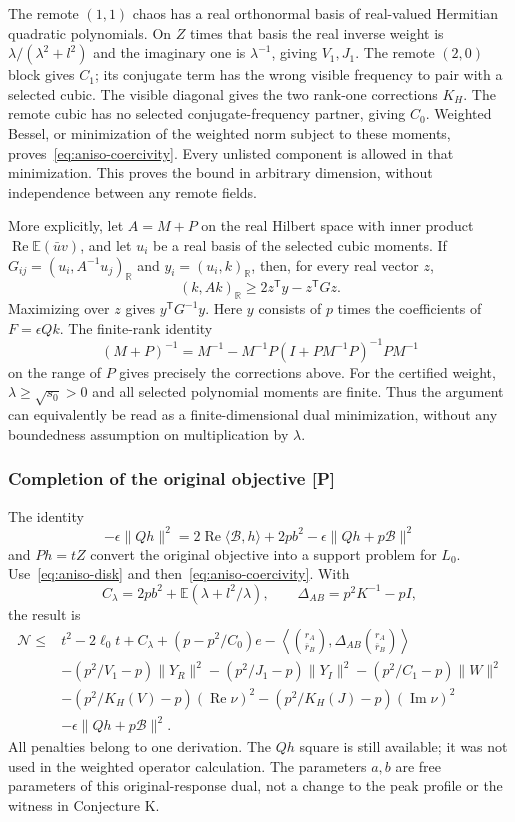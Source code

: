 The remote $(1,1)$ chaos has a real orthonormal basis of real-valued
Hermitian quadratic polynomials. On $Z$ times that basis the real inverse
weight is $\lambda/(\lambda^2+l^2)$ and the imaginary one is
$\lambda^{-1}$, giving $V_1,J_1$. The remote $(2,0)$ block gives $C_1$;
its conjugate term has the wrong visible frequency to pair with a selected
cubic. The visible diagonal gives the two rank-one corrections $K_H$.
The remote cubic has no selected conjugate-frequency partner, giving
$C_0$. Weighted Bessel, or minimization of the weighted norm subject to
these moments, proves~\eqref{eq:aniso-coercivity}. Every unlisted component
is allowed in that minimization. This proves the bound in arbitrary
dimension, without independence between any remote fields.

More explicitly, let $A=M+P$ on the real Hilbert space with inner product
$\operatorname{Re}\mathbb E(\bar u v)$, and let $u_i$ be a real basis of
the selected cubic moments. If
$G_{ij}=(u_i,A^{-1}u_j)_{\mathbb R}$ and
$y_i=(u_i,k)_{\mathbb R}$, then, for every real vector $z$,
\[
 (k,Ak)_{\mathbb R}\ge 2z^{\mathsf T}y-z^{\mathsf T}Gz.
\]
Maximizing over $z$ gives $y^{\mathsf T}G^{-1}y$. Here $y$ consists of
$p$ times the coefficients of $F=\epsilon Qk$. The finite-rank identity
\[
 (M+P)^{-1}=M^{-1}-M^{-1}P(I+PM^{-1}P)^{-1}PM^{-1}
\]
on the range of $P$ gives precisely the corrections above. For the
certified weight, $\lambda\ge\sqrt{s_0}>0$ and all selected polynomial
moments are finite. Thus the argument can equivalently be read as a
finite-dimensional dual minimization, without any boundedness assumption
on multiplication by $\lambda$.

\subsubsection{Completion of the original objective [P]}
The identity
\[
 -\epsilon\|Qh\|^2
 =2\operatorname{Re}\langle\mathcal B,h\rangle+2pb^2
                  -\epsilon\|Qh+p\mathcal B\|^2
\]
and $Ph=tZ$ convert the original objective into a support problem for
$L_0$. Use~\eqref{eq:aniso-disk} and then~\eqref{eq:aniso-coercivity}.
With
\[
 C_\lambda=2pb^2+\mathbb E(\lambda+l^2/\lambda),\qquad
 \Delta_{AB}=p^2K^{-1}-pI,
\]
the result is
\begin{equation}\label{eq:aniso-general}
\begin{aligned}
 \mathcal N\le{}&t^2-2\ell_0t+C_\lambda+(p-p^2/C_0)e
 -\left\langle\binom{r_A}{\overline r_B},\Delta_{AB}
                         \binom{r_A}{\overline r_B}\right\rangle\\
 &-(p^2/V_1-p)\|Y_R\|^2-(p^2/J_1-p)\|Y_I\|^2
       -(p^2/C_1-p)\|W\|^2\\
 &-(p^2/K_H(V)-p)(\operatorname{Re}\nu)^2
       -(p^2/K_H(J)-p)(\operatorname{Im}\nu)^2\\
 &-\epsilon\|Qh+p\mathcal B\|^2.
\end{aligned}
\end{equation}
All penalties belong to one derivation. The $Qh$ square is still available;
it was not used in the weighted operator calculation. The parameters
$a,b$ are free parameters of this original-response dual, not a change
to the peak profile or the witness in Conjecture K.


